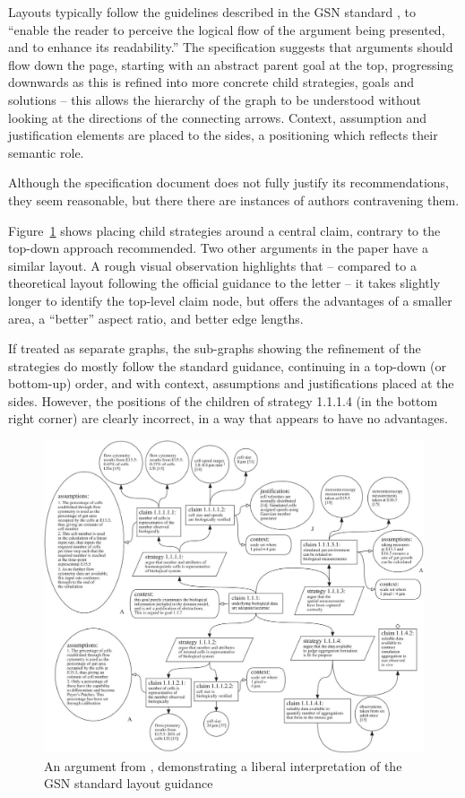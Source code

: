 Layouts typically follow the guidelines described in the GSN standard \citep[section~2.2, pp.~26--27]{gsnstandard},
to ``enable the reader to perceive the logical flow of the argument being presented, and to enhance its readability.''
The specification suggests that arguments should flow down the page, starting with an abstract parent goal at the top, progressing downwards as this is refined into more concrete child strategies, goals and solutions -- this allows the hierarchy of the graph to be understood without looking at the directions of the connecting arrows.
Context, assumption and justification elements are placed to the sides, a positioning which reflects their semantic role.

Although the specification document does not fully justify its recommendations, they seem reasonable, but there there are instances of authors contravening them.

Figure~\ref{fig:aldencentral} shows \citet{royal} placing child strategies around a central claim, contrary to the top-down approach recommended. Two other arguments in the paper \cite[pp.~8--9]{royal} have a similar layout.
A rough visual observation highlights that -- compared to a theoretical layout following the official guidance to the letter -- it takes slightly longer to identify the top-level claim node, but offers the advantages of a smaller area, a ``better'' aspect ratio, and better edge lengths. 

If treated as separate graphs, the sub-graphs showing the refinement of the strategies do mostly follow the standard guidance, continuing in a top-down (or bottom-up) order, and with context, assumptions and justifications placed at the sides. However, the positions of the children of strategy 1.1.1.4 (in the bottom right corner) are clearly incorrect, in a way that appears to have no advantages.

\begin{figure}
    \includegraphics[width=\textwidth]{graphics/aldencentral.jpg}
    \caption{An argument from \cite{royal}, demonstrating a liberal interpretation of the GSN standard layout guidance}
    \label{fig:aldencentral}
\end{figure}

